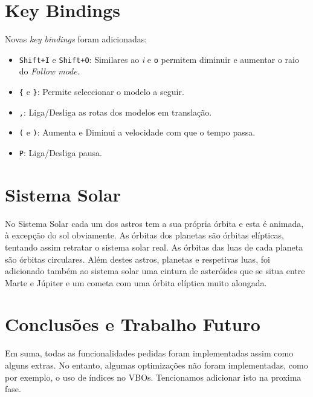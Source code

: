 \documentclass[a4paper]{article}
\begin{document}
\section{Key Bindings}

Novas \textit{key bindings} foram adicionadas:

\begin{itemize}
    \item \texttt{Shift+I} e \texttt{Shift+O}: Similares ao \textit{i} e
        \texttt{o} permitem diminuir e aumentar o raio do \textit{Follow mode}.
    \item \verb!{! e \verb!}!: Permite seleccionar o modelo a seguir.
    \item \texttt{,}: Liga/Desliga as rotas dos modelos em translação.
    \item \verb!(! e \verb!)!: Aumenta e Diminui a velocidade com que o tempo
        passa.
    \item \texttt{P}: Liga/Desliga pausa.
\end{itemize}

\section{Sistema Solar}

No Sistema Solar cada um dos astros tem a sua própria órbita e esta é animada, à excepção do sol obviamente.
As órbitas dos planetas são órbitas elípticas, tentando assim retratar o sistema solar real. As órbitas das luas de cada planeta são órbitas circulares.
Além destes astros, planetas e respetivas luas, foi adicionado também ao sistema solar uma cintura de asteróides que se situa entre Marte e Júpiter e um cometa com uma órbita elíptica muito alongada.

\section{Conclusões e Trabalho Futuro}

Em suma, todas as funcionalidades pedidas foram implementadas assim como alguns extras. No entanto, algumas optimizações não foram implementadas, como por exemplo, o uso de índices no VBOs. Tencionamos adicionar isto na proxima fase.
\end{document}
